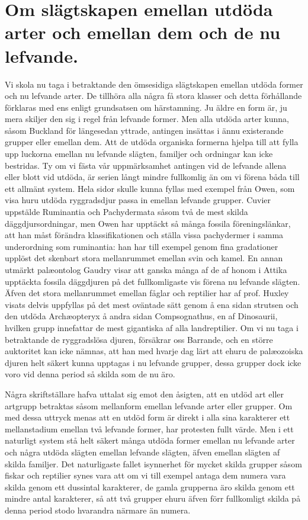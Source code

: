 \section[Slägtskap emellan utöda och lefvande]{Om slägtskapen emellan utdöda arter och emellan
dem och de nu lefvande.}

Vi skola nu taga i betraktande den ömsesidiga slägtskapen emellan utdöda former och nu lefvande arter. De tillhöra alla några få stora klasser och detta förhållande förklaras med ens enligt grundsatsen om härstamning. Ju äldre en form är, ju mera skiljer den sig i regel från lefvande former. Men alla utdöda arter kunna, såsom Buckland för längesedan yttrade, antingen insättas i ännu existerande grupper eller emellan dem. Att de utdöda organiska formerna hjelpa till att fylla upp luckorna emellan nu lefvande slägten, familjer och ordningar kan icke bestridas. Ty om vi fästa vår uppmärksamhet antingen vid de lefvande allena eller blott vid utdöda, är serien långt mindre fullkomlig än om vi förena båda till ett allmänt system. Hela sidor skulle kunna fyllas med exempel från Owen, som visa huru utdöda ryggradsdjur passa in emellan lefvande grupper. Cuvier uppstälde Ruminantia och Pachydermata såsom två de mest skilda däggdjursordningar, men Owen har upptäckt så många fossila föreningslänkar, att han måst förändra klassifikationen och ställa vissa pachydermer i samma underordning som ruminantia: han har till exempel genom fina gradationer upplöst det skenbart stora mellanrummet emellan svin och kamel. En annan utmärkt palæontolog Gaudry visar att ganska många af de af honom i Attika upptäckta fossila däggdjuren på det fullkomligaste vis förena nu lefvande slägten. Äfven det stora mellanrummet emellan fåglar och reptilier har af prof. Huxley visats delvis uppfyllas på det mest oväntade sätt genom å ena sidan strutsen och den utdöda Archæopteryx å andra sidan Compsognathus, en af Dinosaurii, hvilken grupp innefattar de mest gigantiska af alla landreptilier. Om vi nu taga i betraktande de ryggradslösa djuren, försäkrar oss Barrande, och en större auktoritet kan icke nämnas, att han med hvarje dag lärt att ehuru de palæozoiska djuren helt säkert kunna upptagas i nu lefvande grupper, dessa grupper dock icke voro vid denna period så skilda som de nu äro.

Några skriftställare hafva uttalat sig emot den åsigten, att en utdöd art eller artgrupp betraktas såsom mellanform emellan lefvande arter eller grupper. Om med dessa uttryck menas att en utdöd form är direkt i alla sina karakterer ett mellanstadium emellan två lefvande former, har protesten fullt värde. Men i ett naturligt system stå helt säkert många utdöda former emellan nu lefvande arter och några utdöda slägten emellan lefvande slägten, äfven emellan slägten af skilda familjer. Det naturligaste fallet isynnerhet för mycket skilda grupper såsom fiskar och reptilier synes vara att om vi till exempel antaga dem numera vara skilda genom ett dussintal karakterer, de gamla grupperna äro skilda genom ett mindre antal karakterer, så att två grupper ehuru äfven förr fullkomligt skilda på denna period stodo hvarandra närmare än numera.

